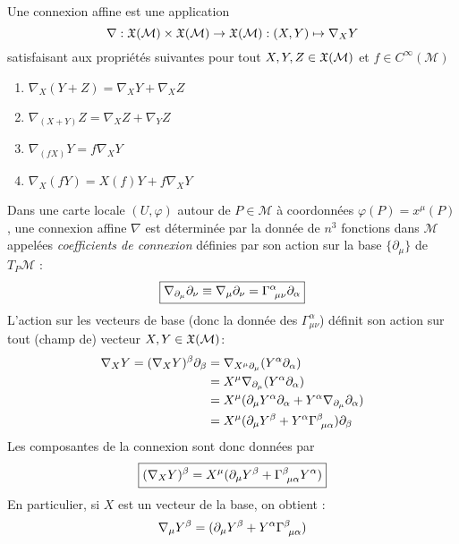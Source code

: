 \begin{theoremframe}
    \begin{defi}
    \label{def:connexion affine}
        Une connexion affine est une application 
        $$\nabla : \mathfrak{X}(\mathcal{M})\times \mathfrak{X}(\mathcal{M}) \to \mathfrak{X} (\mathcal{M}):(X, Y) \mapsto \nabla_{X}Y $$
        satisfaisant aux propriétés suivantes pour tout $ X, Y, Z \in \mathfrak{X}(\mathcal{M})$ et $ f \in C^{\infty}(\mathcal{M})$
        \begin{enumerate}[label=\roman*.]
            \item $\nabla_{X}(Y+Z) = \nabla_{X}Y + \nabla_{X}Z$
            \item $\nabla_{(X+Y)} Z = \nabla_{X} Z+\nabla_{Y}Z$
            \item $\nabla_{(fX)}Y = f\nabla_{X}Y$
            \item $\nabla_{X}(fY) = X(f)Y + f\nabla_{X}Y$
        \end{enumerate}
    \end{defi}
\end{theoremframe}
Dans une carte locale $(U, \varphi)$ autour de $P\in \mathcal{M}$ à coordonnées $\varphi(P) = x^{\mu}(P)$, 
une connexion affine $\nabla$ est déterminée par la donnée de $n^3$ fonctions dans $\mathcal{M}$ appelées \textit{coefficients de connexion} définies par son action sur la base $\{\partial_{\mu}\}$ de $T_{P}\mathcal{M}$ :
\begin{equation}
    \boxed{\nabla_{\partial_{\mu}}\partial_{\nu} \equiv \nabla_\mu \pd_\nu = \Gamma\indices{^{\alpha}_{\!\mu \nu}}\partial_{\alpha}}
\end{equation}
L'action sur les vecteurs de base (donc la donnée des $\Gamma^{\alpha}_{\!\mu \nu}$) définit son action sur tout (champ de) vecteur
$ X,Y\in \mathfrak{X}(\mathcal{M})$:
\begin{align}
     \nabla_{X}Y =(\nabla_{X}Y)^{\beta}\partial_{\beta} &=  \nabla_{X^{\mu}\partial_{\mu}}(Y^{\alpha}\partial_{\alpha})\\
     &= X^{\mu}\nabla_{\partial_{\mu}}(Y^{\alpha}\partial_{\alpha}) \\
     &= X^{\mu}(\partial_{\mu}Y^{\alpha}\partial_{\alpha} + Y^{\alpha}\nabla_{\partial_{\mu}}\partial_{\alpha})\\
     &=X^{\mu}(\partial_{\mu}Y^{\beta} + Y^{\alpha}\Gamma\indices{^{\beta}_{\!\mu \alpha}})\partial_{\beta}
\end{align}
Les composantes de la connexion sont donc données par
\begin{equation}
    \boxed{(\nabla_{X}Y)^{\beta} = X^\mu (\partial_{\mu}Y^{\beta} + \Gamma\indices{^{\beta}_{\!\mu \alpha}}Y^{\alpha})}
    \label{def: dérivée covariante vecteur}
\end{equation}
En particulier, si $X$ est un vecteur de la base, on obtient :
\begin{equation} 
    \nabla_{\mu}Y^{\beta} = (\partial_{\mu}Y^{\beta} + Y^{\alpha}\Gamma\indices{^{\beta}_{\!\mu \alpha}})
\end{equation}
